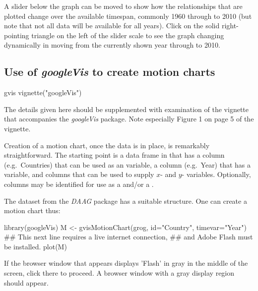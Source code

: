 A slider below the graph can be moved to show how the relationships
that are plotted change over the available timespan, commonly 1960
through to 2010 (but note that not all data will be available for all
years).  Click on the solid right-pointing triangle on the left of
the slider scale to see the graph changing dynamically in moving from the
currently shown year through to 2010.

\subsection*{Use of {\em googleVis} to create motion charts}\label{ss:gvis}

\begin{SaveVerbatim}{gvis}
vignette("googleVis")
\end{SaveVerbatim}

The details given here should be supplemented with examination
of the vignette that accompanies the {\em
googleVis} package.  Note especially Figure 1 on page 5 of the
vignette.

Creation of a motion chart, once the data is in place, is remarkably
straightforward. The starting point is a data frame in that has a
column (e.g.\ Countries) that can be used as an  variable, a
column (e.g.\ Year) that has a  variable, and columns
that can be used to supply $x$- and $y$- variables.  Optionally,
columns may be identified for use as a  and/or a
.

The dataset  from the {\em DAAG} package has a suitable
structure.  One can create a motion chart thus:
\begin{minipage}[t]{1.075\textwidth}
\begin{Schunk}
\begin{Sinput}
library(googleVis)
M <- gvisMotionChart(grog, id="Country", timevar="Year")
## This next line requires a live internet connection,
## and Adobe Flash must be installed.
plot(M)
\end{Sinput}
\end{Schunk}
\end{minipage}
If the browser window that appears displays 'Flash' in gray in the
middle of the screen, click there to proceed.  A browser window with a
gray display region should appear.

